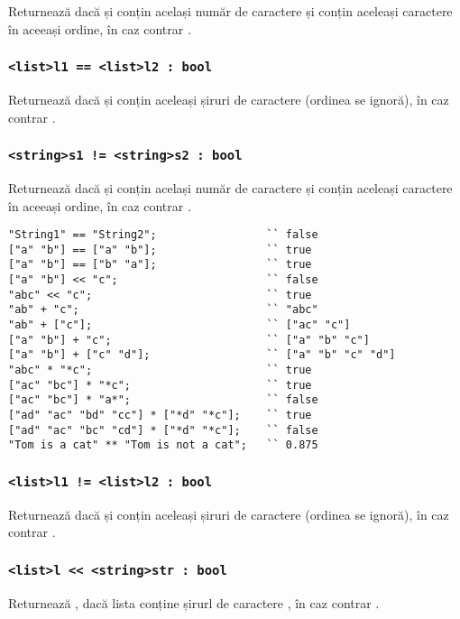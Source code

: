 Returnează \true{} dacă  și  conțin același număr de caractere și conțin aceleași caractere în aceeași ordine, în caz contrar \false{}.

\subsubsection{\lstinline|<list>l1 == <list>l2 : bool|}

Returnează \true{} dacă  și  conțin aceleași șiruri de caractere (ordinea se ignoră), în caz contrar \false{}.

\subsubsection{\lstinline`<string>s1 != <string>s2 : bool`}

Returnează \false{} dacă  și  conțin același număr de caractere și conțin aceleași caractere în aceeași ordine, în caz contrar \true{}.

\begin{lstlisting}[caption=Exemple de folosire al operatorilor asupra tipului string și list, label=stringlistopex]
"String1" == "String2";					`` false
["a" "b"] == ["a" "b"];					`` true
["a" "b"] == ["b" "a"];					`` true
["a" "b"] << "c";						`` false
"abc" << "c";							`` true
"ab" + "c";								`` "abc"
"ab" + ["c"];							`` ["ac" "c"]
["a" "b"] + "c";						`` ["a" "b" "c"]
["a" "b"] + ["c" "d"];					`` ["a" "b" "c" "d"]
"abc" * "*c";							`` true
["ac" "bc"] * "*c";						`` true
["ac" "bc"] * "a*";						`` false
["ad" "ac" "bd" "cc"] * ["*d" "*c"];	`` true
["ad" "ac" "bc" "cd"] * ["*d" "*c"];	`` false
"Tom is a cat" ** "Tom is not a cat";	`` 0.875
\end{lstlisting}

\subsubsection{\lstinline|<list>l1 != <list>l2 : bool|}

Returnează \false{} dacă  și  conțin aceleași șiruri de caractere (ordinea se ignoră), în caz contrar \true{}.

\subsubsection{\lstinline|<list>l << <string>str : bool|}

Returnează \true{}, dacă lista  conține șirurl de caractere , în caz contrar \false{}.

